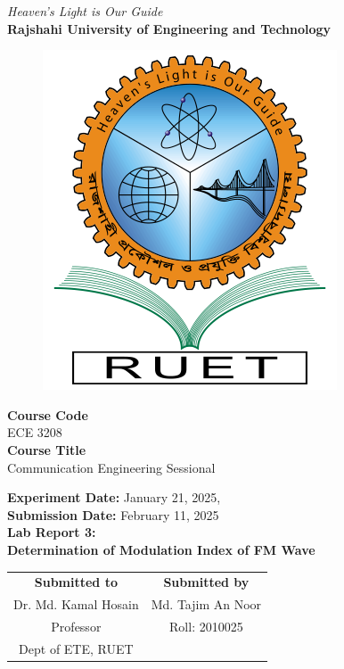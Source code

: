 \vspace*{\fill}
\begin{center}

    \emph{Heaven's Light is Our Guide} \\
    \textbf{Rajshahi University of Engineering and Technology} \\

    \begin{figure}[H]
        \centering
        \includegraphics[scale=.34]{images/RUET_logo.png}
        \label{fig:ruet_logo}
    \end{figure}
    \vspace{5mm}

    \textbf{Course Code}\\
    ECE 3208\\
    \vspace{3mm}
    \textbf{Course Title}\\
    Communication Engineering Sessional

    \vspace{5mm}
    \textbf{Experiment Date:} {January 21, 2025},\\
    \textbf{Submission Date:} {February 11, 2025}\\

    \vspace{5mm}
    \textbf{Lab Report 3: \\
        Determination of Modulation Index of FM Wave}

    \vspace{15mm}

    \begin{tabular}{c|c}
        \textbf{Submitted to} & \textbf{Submitted by} \\
        Dr. Md. Kamal Hosain  & Md. Tajim An Noor     \\
        Professor             & Roll: 2010025         \\
        Dept of ETE, RUET     &                       \\
    \end{tabular}

\end{center}
\vspace*{\fill}
